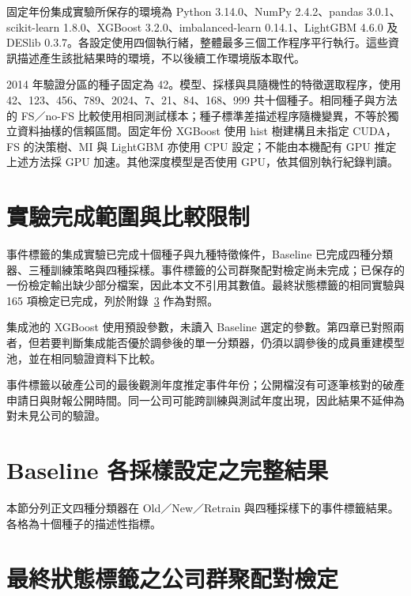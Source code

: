 

固定年份集成實驗所保存的環境為 Python 3.14.0、NumPy 2.4.2、pandas 3.0.1、scikit-learn 1.8.0、XGBoost 3.2.0、imbalanced-learn 0.14.1、LightGBM 4.6.0 及 DESlib 0.3.7。各設定使用四個執行緒，整體最多三個工作程序平行執行。這些資訊描述產生該批結果時的環境，不以後續工作環境版本取代。

2014 年驗證分區的種子固定為 42。模型、採樣與具隨機性的特徵選取程序，使用 42、123、456、789、2024、7、21、84、168、999 共十個種子。相同種子與方法的 FS／no-FS 比較使用相同測試樣本；種子標準差描述程序隨機變異，不等於獨立資料抽樣的信賴區間。固定年份 XGBoost 使用 hist 樹建構且未指定 CUDA，FS 的決策樹、MI 與 LightGBM 亦使用 CPU 設定；不能由本機配有 GPU 推定上述方法採 GPU 加速。其他深度模型是否使用 GPU，依其個別執行紀錄判讀。

\section{實驗完成範圍與比較限制}\label{sec:method-evidence}

事件標籤的集成實驗已完成十個種子與九種特徵條件，Baseline 已完成四種分類器、三種訓練策略與四種採樣。事件標籤的公司群聚配對檢定尚未完成；已保存的一份檢定輸出缺少部分檔案，因此本文不引用其數值。最終狀態標籤的相同實驗與 165 項檢定已完成，列於附錄~\ref{sec:stats-full} 作為對照。

集成池的 XGBoost 使用預設參數，未讀入 Baseline 選定的參數。第四章已對照兩者，但若要判斷集成能否優於調參後的單一分類器，仍須以調參後的成員重建模型池，並在相同驗證資料下比較。

事件標籤以破產公司的最後觀測年度推定事件年份；公開檔沒有可逐筆核對的破產申請日與財報公開時間。同一公司可能跨訓練與測試年度出現，因此結果不延伸為對未見公司的驗證。

\clearpage
\section{Baseline 各採樣設定之完整結果}\label{sec:results-baseline-full}

本節分列正文四種分類器在 Old／New／Retrain 與四種採樣下的事件標籤結果。各格為十個種子的描述性指標。



\section{最終狀態標籤之公司群聚配對檢定}\label{sec:stats-full}

